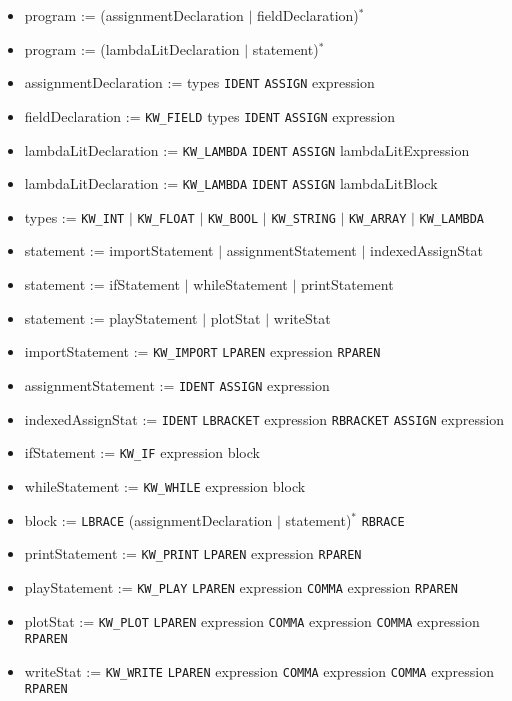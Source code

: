 \begin{itemize}
	\item program := (assignmentDeclaration $|$ fieldDeclaration)$^*$
	\item program := (lambdaLitDeclaration $|$ statement)$^*$
	\item assignmentDeclaration := types \texttt{IDENT} \texttt{ASSIGN} expression
	\item fieldDeclaration := \texttt{KW\_FIELD} types \texttt{IDENT} \texttt{ASSIGN} expression	
	\item lambdaLitDeclaration := \texttt{KW\_LAMBDA} \texttt{IDENT} \texttt{ASSIGN} lambdaLitExpression
	\item lambdaLitDeclaration := \texttt{KW\_LAMBDA} \texttt{IDENT} \texttt{ASSIGN} lambdaLitBlock
	\item types := \texttt{KW\_INT} $|$ \texttt{KW\_FLOAT} $|$ \texttt{KW\_BOOL} $|$ \texttt{KW\_STRING} $|$ \texttt{KW\_ARRAY} $|$ \texttt{KW\_LAMBDA}
	\item statement := importStatement $|$ assignmentStatement $|$ indexedAssignStat
	\item statement := ifStatement $|$ whileStatement $|$ printStatement
	\item statement := playStatement $|$ plotStat $|$ writeStat
	\item importStatement := \texttt{KW\_IMPORT} \texttt{LPAREN} expression \texttt{RPAREN}
	\item assignmentStatement := \texttt{IDENT} \texttt{ASSIGN} expression
	\item indexedAssignStat := \texttt{IDENT} \texttt{LBRACKET} expression \texttt{RBRACKET} \texttt{ASSIGN} expression
	\item ifStatement := \texttt{KW\_IF} expression block
	\item whileStatement := \texttt{KW\_WHILE} expression block
	\item block := \texttt{LBRACE} (assignmentDeclaration $|$ statement)$^*$ \texttt{RBRACE}
	\item printStatement := \texttt{KW\_PRINT} \texttt{LPAREN} expression \texttt{RPAREN}
	\item playStatement := \texttt{KW\_PLAY} \texttt{LPAREN} expression \texttt{COMMA} expression \texttt{RPAREN}
	\item plotStat := \texttt{KW\_PLOT} \texttt{LPAREN} expression \texttt{COMMA} expression \texttt{COMMA} expression \texttt{RPAREN}
	\item writeStat := \texttt{KW\_WRITE} \texttt{LPAREN} expression \texttt{COMMA} expression \texttt{COMMA} expression \texttt{RPAREN}
\end{itemize}

